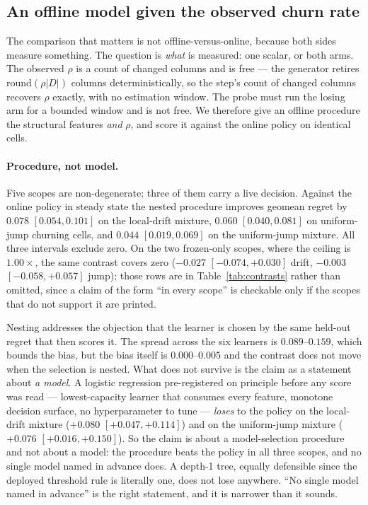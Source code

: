 \documentclass{article}
\begin{document}
\subsection{An offline model given the observed churn rate}
\label{sec:contrast}

The comparison that matters is not offline-versus-online, because both sides
measure something. The question is \emph{what} is measured: one scalar, or both
arms. The observed $\rho$ is a count of changed columns and is free --- the
generator retires $\mathrm{round}(\rho|D|)$ columns deterministically, so the
step's count of changed columns recovers $\rho$ exactly, with no estimation
window. The probe must run the losing arm for a bounded window and is not free.
We therefore give an offline procedure the structural features \emph{and} $\rho$,
and score it against the online policy on identical cells.

\paragraph{Procedure, not model.} Five scopes are non-degenerate; three of them
carry a live decision. Against the online policy in steady state the nested
procedure improves geomean regret by $0.078$ $[0.054, 0.101]$ on the local-drift
mixture, $0.060$ $[0.040, 0.081]$ on uniform-jump churning cells, and $0.044$
$[0.019, 0.069]$ on the uniform-jump mixture. All three intervals exclude zero.
On the two frozen-only scopes, where the ceiling is $1.00\times$, the same
contrast covers zero ($-0.027$ $[-0.074, +0.030]$ drift, $-0.003$ $[-0.058,
+0.057]$ jump); those rows are in Table~\ref{tab:contrasts} rather than omitted,
since a claim of the form ``in every scope'' is checkable only if the scopes that
do not support it are printed.

Nesting addresses the objection that the learner is chosen by the same held-out
regret that then scores it. The spread across the six learners is
$0.089$--$0.159$, which bounds the bias, but the bias itself is $0.000$--$0.005$
and the contrast does not move when the selection is nested. What does not
survive is the claim as a statement about \emph{a model}. A logistic regression
pre-registered on principle before any score was read --- lowest-capacity learner
that consumes every feature, monotone decision surface, no hyperparameter to tune
--- \emph{loses} to the policy on the local-drift mixture ($+0.080$ $[+0.047,
+0.114]$) and on the uniform-jump mixture ($+0.076$ $[+0.016, +0.150]$). So the
claim is about a model-selection procedure and not about a model: the procedure
beats the policy in all three scopes, and no single model named in advance does.
A depth-1 tree, equally defensible since the deployed threshold rule is literally
one, does not lose anywhere. ``No single model named in advance'' is the right
statement, and it is narrower than it sounds.
\end{document}
